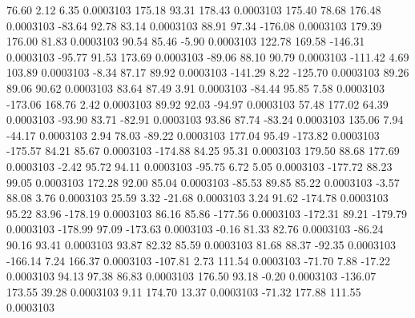        76.60        2.12        6.35     0.0003103
      175.18       93.31      178.43     0.0003103
      175.40       78.68      176.48     0.0003103
      -83.64       92.78       83.14     0.0003103
       88.91       97.34     -176.08     0.0003103
      179.39      176.00       81.83     0.0003103
       90.54       85.46       -5.90     0.0003103
      122.78      169.58     -146.31     0.0003103
      -95.77       91.53      173.69     0.0003103
      -89.06       88.10       90.79     0.0003103
     -111.42        4.69      103.89     0.0003103
       -8.34       87.17       89.92     0.0003103
     -141.29        8.22     -125.70     0.0003103
       89.26       89.06       90.62     0.0003103
       83.64       87.49        3.91     0.0003103
      -84.44       95.85        7.58     0.0003103
     -173.06      168.76        2.42     0.0003103
       89.92       92.03      -94.97     0.0003103
       57.48      177.02       64.39     0.0003103
      -93.90       83.71      -82.91     0.0003103
       93.86       87.74      -83.24     0.0003103
      135.06        7.94      -44.17     0.0003103
        2.94       78.03      -89.22     0.0003103
      177.04       95.49     -173.82     0.0003103
     -175.57       84.21       85.67     0.0003103
     -174.88       84.25       95.31     0.0003103
      179.50       88.68      177.69     0.0003103
       -2.42       95.72       94.11     0.0003103
      -95.75        6.72        5.05     0.0003103
     -177.72       88.23       99.05     0.0003103
      172.28       92.00       85.04     0.0003103
      -85.53       89.85       85.22     0.0003103
       -3.57       88.08        3.76     0.0003103
       25.59        3.32      -21.68     0.0003103
        3.24       91.62     -174.78     0.0003103
       95.22       83.96     -178.19     0.0003103
       86.16       85.86     -177.56     0.0003103
     -172.31       89.21     -179.79     0.0003103
     -178.99       97.09     -173.63     0.0003103
       -0.16       81.33       82.76     0.0003103
      -86.24       90.16       93.41     0.0003103
       93.87       82.32       85.59     0.0003103
       81.68       88.37      -92.35     0.0003103
     -166.14        7.24      166.37     0.0003103
     -107.81        2.73      111.54     0.0003103
      -71.70        7.88      -17.22     0.0003103
       94.13       97.38       86.83     0.0003103
      176.50       93.18       -0.20     0.0003103
     -136.07      173.55       39.28     0.0003103
        9.11      174.70       13.37     0.0003103
      -71.32      177.88      111.55     0.0003103
